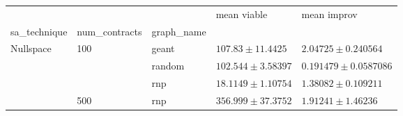 \begin{tabular}{lllll}
\toprule
 &  &  & mean viable & mean improv \\
sa_technique & num_contracts & graph_name &  &  \\
\midrule
\multirow[t]{4}{*}{Nullspace} & \multirow[t]{3}{*}{100} & geant & $107.83\pm11.4425$ & $2.04725\pm0.240564$ \\
 &  & random & $102.544\pm3.58397$ & $0.191479\pm0.0587086$ \\
 &  & rnp & $18.1149\pm1.10754$ & $1.38082\pm0.109211$ \\
\cline{2-5}
 & 500 & rnp & $356.999\pm37.3752$ & $1.91241\pm1.46236$ \\
\cline{1-5} \cline{2-5}
\bottomrule
\end{tabular}
